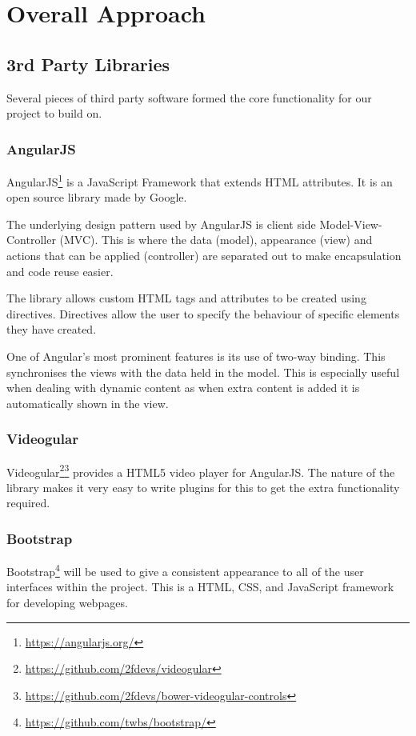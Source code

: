 \chapter{Overall Approach} 
\label{Chapter:Overall Approach}

\section{3rd Party Libraries}
Several pieces of third party software formed the core functionality for our project to build on.

\subsection{AngularJS}
\label{Section:AngularJS}
AngularJS\footnote{\url{https://angularjs.org/}} is a JavaScript Framework that extends HTML attributes. It is an open source library made by Google.

The underlying design pattern used by AngularJS is client side Model-View-Controller (MVC). This is where the data (model), appearance (view) and actions that can be applied (controller) are separated out to make encapsulation and code reuse easier. 

The library allows custom HTML tags and attributes to be created using directives. Directives allow the user to specify the behaviour of specific elements they have created.

One of Angular's most prominent features is its use of two-way binding. This synchronises the views with the data held in the model. This is especially useful when dealing with dynamic content as when extra content is added it is automatically shown in the view.

\subsection{Videogular}
\label{Section:Videogular}
Videogular\footnote{\url{https://github.com/2fdevs/videogular}}\footnote{\url{https://github.com/2fdevs/bower-videogular-controls}} provides a HTML5 video player for AngularJS. The nature of the library makes it very easy to write plugins for this to get the extra functionality required.

\subsection{Bootstrap}
\label{Section:Bootstrap}
Bootstrap\footnote{\url{https://github.com/twbs/bootstrap/}} will be used to give a consistent appearance to all of the user interfaces within the project. This is a HTML, CSS, and JavaScript framework for developing webpages.

